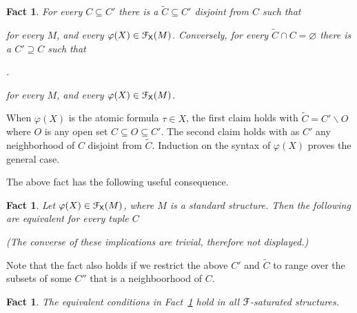\documentclass{amsproc}
\makeatletter
\newcounter{thm}
\theoremstyle{mio}
\newtheorem{fact}[thm]{Fact}\tcolorboxenvironment{fact}{mythm}
\providecommand{\proofNameStyle}{\bfseries}
\renewenvironment{proof}[1][\proofname]{\par
  \pushQED{\qed}%
  \normalfont%
  \trivlist
  \item[\hskip\labelsep
        \proofNameStyle
    #1\@addpunct{.}]\ignorespaces
}{%
  \popQED\endtrivlist\@endpefalse
}
\makeatother
\begin{document}
\begin{fact}
  For every $C\subseteq C'$ there is a $\tilde C\subseteq C'$ disjoint from $C$ such that\smallskip
  
  \smallskip

  for every $M$, and every $\varphi(X)\in{\EuScript F}_{\sf X}(M)$.
  Conversely, for every $\tilde C\cap C=\varnothing$ there is a $C'\supseteq C$ such that

  .\smallskip

  for every $M$, and every $\varphi(X)\in{\EuScript F}_{\sf X}(M)$.
\end{fact}

\begin{proof}
  When $\varphi(X)$ is the atomic formula $\tau\in X$, the first claim holds with $\tilde C=C'\smallsetminus O$ where $O$ is any open set $C\subseteq O\subseteq C'$.
  The second claim holds with as $C'$ any neighborhood of $C$ disjoint from $\tilde C$.
  Induction on the syntax of $\varphi(X)$ proves the general case.
\end{proof}

The above fact has the following useful consequence.

\begin{fact}\label{fact_otto}
  Let $\varphi(X)\in{\EuScript F}_{\sf X}(M)$, where $M$ is a standard structure.
  Then the following are equivalent for every tuple $C$\smallskip
  
    \smallskip

    \smallskip

  (The converse of these implications are trivial, therefore not displayed.)
\end{fact}


Note that the fact also holds if we restrict the above $C'$ and $\tilde C$ to range over the subsets of some $C''$ that is a neighboorhood of $C$.

\begin{fact}\label{fact_saturation}
  The equivalent conditions in Fact~\ref{fact_otto} hold in all ${\EuScript F}$-saturated structures.
\end{fact}
\end{document}
